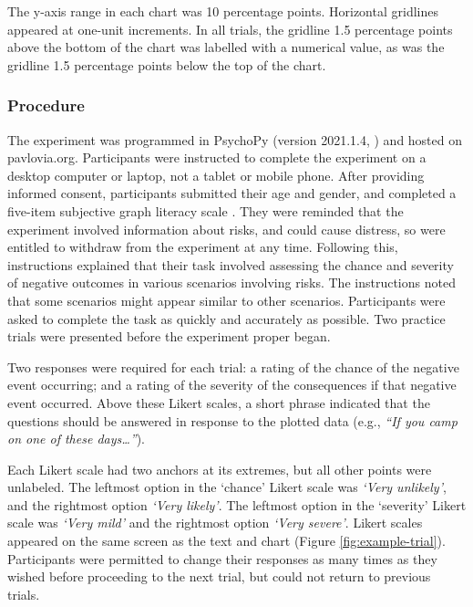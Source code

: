 \documentclass[journal]{vgtc}                %
\begin{document}
The y-axis range in each chart was 10 percentage points. Horizontal
gridlines appeared at one-unit increments. In all trials, the gridline
1.5 percentage points above the bottom of the chart was labelled with a
numerical value, as was the gridline 1.5 percentage points below the top
of the chart.

\hypertarget{procedure}{%
\subsubsection{Procedure}\label{procedure}}

The experiment was programmed in PsychoPy (version 2021.1.4, \citep{peirce_psychopy2_2019}) and hosted on
pavlovia.org. Participants were instructed to complete the experiment on
a desktop computer or laptop, not a tablet or mobile phone. After
providing informed consent, participants submitted their age and gender,
and completed a five-item subjective graph literacy scale
\citep{garcia-retamero_measuring_2016}. They were reminded that the
experiment involved information about risks, and could cause distress,
so were entitled to withdraw from the experiment at any time. Following
this, instructions explained that their task involved assessing the
chance and severity of negative outcomes in various scenarios involving
risks. The instructions noted that some scenarios might appear similar
to other scenarios. Participants were asked to complete the task as
quickly and accurately as possible. Two practice trials were presented
before the experiment proper began.

Two responses were required for each trial: a rating of the chance of
the negative event occurring; and a rating of the severity of the
consequences if that negative event occurred. Above these Likert scales,
a short phrase indicated that the questions should be answered in
response to the plotted data (e.g., \emph{``If you camp on one of these
days\ldots{}''}).

Each Likert scale had two anchors at its extremes, but all other points
were unlabeled. The leftmost option in the `chance' Likert scale was
\emph{`Very unlikely'}, and the rightmost option \emph{`Very likely'}. The
leftmost option in the `severity' Likert scale was \emph{`Very mild'} and the
rightmost option \emph{`Very severe'}. Likert scales appeared on the same
screen as the text and chart (Figure \ref{fig:example-trial}).
Participants were permitted to change their responses as many times as
they wished before proceeding to the next trial, but could not return to
previous trials.
\end{document}
